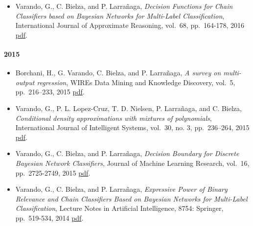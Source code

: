 \documentclass[]{article}
\providecommand{\tightlist}{%
  \setlength{\itemsep}{0pt}\setlength{\parskip}{0pt}}
\let\oldparagraph\paragraph
\renewcommand{\paragraph}[1]{\oldparagraph{#1}\mbox{}}
\begin{document}
\begin{itemize}
\tightlist
\item
  Varando, G., C. Bielza, and P. Larrañaga, \emph{Decision Functions for
  Chain Classifiers based on Bayesian Networks for Multi-Label
  Classification}, International Journal of Approximate Reasoning,
  vol.~68, pp.~164-178, 2016
  \href{http://cig.fi.upm.es/articles/2016/Varando-Decision\%20functions\%20for\%20chain\%20classifiers.pdf}{pdf}.
\end{itemize}

\hypertarget{section-2}{%
\paragraph{2015}\label{section-2}}

\begin{itemize}
\tightlist
\item
  Borchani, H., G. Varando, C. Bielza, and P. Larrañaga, \emph{A survey
  on multi-output regression}, WIREs Data Mining and Knowledge
  Discovery, vol.~5, pp.~216--233, 2015
  \href{http://cig.fi.upm.es/articles/2016/Varando-Decision\%20functions\%20for\%20chain\%20classifiers.pdf}{pdf}.
\item
  Varando, G., P. L. Lopez-Cruz, T. D. Nielsen, P. Larrañaga, and C.
  Bielza, \emph{Conditional density approximations with mixtures of
  polynomials}, International Journal of Intelligent Systems, vol.~30,
  no. 3, pp.~236--264, 2015
  \href{http://cig.fi.upm.es/articles/2016/Varando-Decision\%20functions\%20for\%20chain\%20classifiers.pdf}{pdf}.
\item
  Varando, G., C. Bielza, and P. Larrañaga, \emph{Decision Boundary for
  Discrete Bayesian Network Classifiers}, Journal of Machine Learning
  Research, vol.~16, pp.~2725-2749, 2015
  \href{http://jmlr.csail.mit.edu/papers/v16/varando15a.pdf}{pdf}.
\item
  Varando, G., C. Bielza, and P. Larrañaga, \emph{Expressive Power of
  Binary Relevance and Chain Classifiers Based on Bayesian Networks for
  Multi-Label Classification}, Lecture Notes in Artificial Intelligence,
  8754: Springer, pp.~519-534, 2014
  \href{https://link.springer.com/chapter/10.1007\%2F978-3-319-11433-0_34}{pdf}.
\end{itemize}
\end{document}
